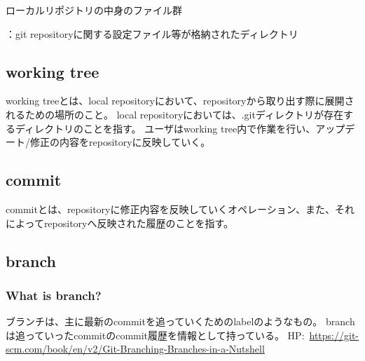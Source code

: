 \documentclass[11pt,a4paper,openany,dvipdfmx]{jsarticle}
\begin{document}
ローカルリポジトリの中身のファイル群
\begin{blueitemize}
  \item \textcolor{Red}{}：git repositoryに関する設定ファイル等が格納されたディレクトリ
  \item {}
  \item {}
\end{blueitemize}


\subsection{working tree} %
\label{sub:working_tree}

\begin{tcolorbox}[
title=working treeについて, fonttitle=\bfseries]
working treeとは、local repositoryにおいて、repositoryから取り出す際に展開されるための場所のこと。
local repositoryにおいては、.gitディレクトリが存在するディレクトリのことを指す。
ユーザはworking tree内で作業を行い、アップデート/修正の内容をrepositoryに反映していく。
\end{tcolorbox}

\subsection{commit} %
\label{sub:commit}

\begin{tcolorbox}[
title=commitについて, fonttitle=\bfseries]
commitとは、repositoryに修正内容を反映していくオペレーション、また、それによってrepositoryへ反映された履歴のことを指す。
\end{tcolorbox}

\subsection{branch} %
\label{sub:branch}

\subsubsection{What is branch?} %
\label{ssub:what_is_branch_}

\begin{tcolorbox}[
title=branchについて, fonttitle=\bfseries]
ブランチは、主に最新のcommitを追っていくためのlabelのようなもの。
branchは追っていったcommitのcommit履歴を情報として持っている。
\tcblower
HP:\ \url{https://git-scm.com/book/en/v2/Git-Branching-Branches-in-a-Nutshell}
\end{tcolorbox}
\end{document}
